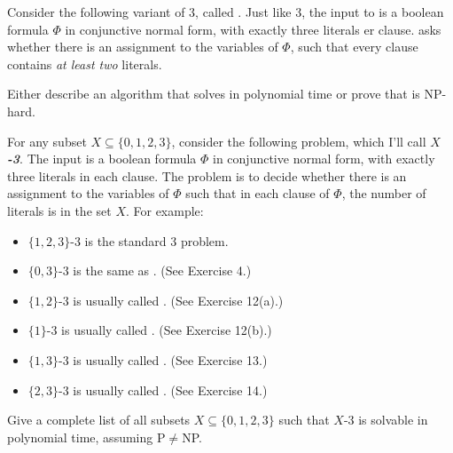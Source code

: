 \begin{exercises}
\item {} Consider the following variant of 3, called .
Just like 3, the input to  is a boolean formula $\Phi$ in conjunctive normal form, with exactly three literals er clause.
 asks whether there is an assignment to the variables of $\Phi$, such that every clause contains \textit{at least two}  literals.

Either describe an algorithm that solves  in polynomial time or prove that  is NP-hard.

\item {} For any subset $X \subseteq \{0,1,2,3\}$, consider the following problem, which I’ll call $X$\textbf{\textit{-3}}.
The input is a boolean formula $\Phi$ in conjunctive normal form, with exactly three literals in each clause.
The problem is to decide whether there is an assignment to the variables of $\Phi$ such that in each clause of $\Phi$, the number of  literals is in the set $X$.
For example:
\begin{itemize}
\item $\{1,2,3\}$-3 is the standard 3 problem.
\item $\{0,3\}$-3 is the same as . (See Exercise 4.)
\item $\{1,2\}$-3 is usually called . (See Exercise 12(a).)
\item $\{1\}$-3 is usually called . (See Exercise 12(b).)
\item $\{1,3\}$-3 is usually called . (See Exercise 13.)
\item $\{2,3\}$-3 is usually called . (See Exercise 14.)
\end{itemize}
Give a complete list of all subsets $X \subseteq \{0,1,2,3\}$ such that $X$-3 is solvable in polynomial time, assuming P${}\neq{}$NP.


\end{exercises}
